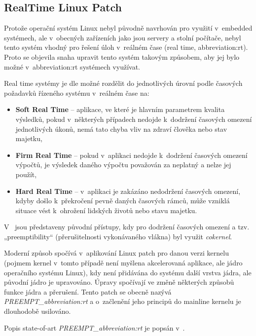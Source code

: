\documentclass[a4paper, twoside, 11pt]{article}
\begin{document}
		\subsection{RealTime Linux Patch}\label{subsec:real-time-linux-patch}
			Protože operační systém Linux nebyl původně navrhován pro využití v~embedded systémech, ale v~obecných zařízeních jako jsou servery a stolní počítače, nebyl tento systém vhodný pro řešení úloh v~reálném čase (real time, \gls{abbreviation:rt}). Proto se objevila snaha upravit tento systém takovým způsobem, aby jej bylo možné v~\gls{abbreviation:rt} systémech využívat.\par
			Real time systémy je dle \cite{the-real-time-linux-kernel-survey-on-preempt-rt} možné rozdělit do jednotlivých úrovní podle časových požadavků řízeného systému v~reálném čase na:
			\begin{itemize}
				\item \textbf{Soft Real Time} – aplikace, ve které je hlavním parametrem kvalita výsledků, pokud v~některých případech nedojde k~dodržení časových omezení jednotlivých úkonů, nemá tato chyba vliv na zdraví člověka nebo stav majetku,
				\item \textbf{Firm Real Time} – pokud v~aplikaci nedojde k~dodržení časových omezení výpočtů, je výsledek daného výpočtu považován za neplatný a nelze jej použít,
				\item \textbf{Hard Real Time} – v~aplikaci je zakázáno nedodržení časových omezení, kdyby došlo k~překročení pevně daných časových rámců, může vzniklá situace vést k~ohrožení lidských životů nebo stavu majetku.
			\end{itemize}\par
			V~\cite{the-real-time-linux-kernel-survey-on-preempt-rt} jsou představeny původní přístupy, kdy pro dodržení časových omezení a tzv. „preemptibility“ (přerušitelnosti vykonávaného vlákna) byl využit \textit{cokernel}.\par
			Moderní způsob spočívá v~aplikování Linux patch pro danou verzi kernelu (pojmem kernel v~tomto případě není myšlena akcelerovaná aplikace, ale jádro operačního systému Linux), kdy není přidávána do systému další vrstva jádra, ale původní jádro je upravováno. Úpravy spočívají ve změně některých způsobů funkce jádra a přerušení. Tento patch se obecně nazývá \textit{PREEMPT\_\gls{abbreviation:rt}} a o~začlenění jeho principů do mainline kernelu je dlouhodobě usilováno. \cite{the-real-time-linux-kernel-survey-on-preempt-rt}\par
			Popis state-of-art \textit{PREEMPT\_\gls{abbreviation:rt}} je popsán v~\cite{the-real-time-linux-kernel-survey-on-preempt-rt}.\par
\end{document}
